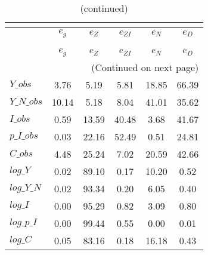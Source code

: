  
\begin{center}
\begin{longtable}{lccccc} 
\caption{VARIANCE DECOMPOSITION (in percent)}\\
 \label{Table:th_var_decomp_uncond}\\
\toprule 
$           $	 & 	 $       {e_g}$	 & 	 $       {e_Z}$	 & 	 $    {e_{ZI}}$	 & 	 $       {e_N}$	 & 	 $       {e_D}$\\
\midrule \endfirsthead 
\caption{(continued)}\\
 \toprule \\ 
$           $	 & 	 $       {e_g}$	 & 	 $       {e_Z}$	 & 	 $    {e_{ZI}}$	 & 	 $       {e_N}$	 & 	 $       {e_D}$\\
\midrule \endhead 
\midrule \multicolumn{6}{r}{(Continued on next page)} \\ \bottomrule \endfoot 
\bottomrule \endlastfoot 
$Y\_obs     $	 & 	        3.76	 & 	        5.19	 & 	        5.81	 & 	       18.85	 & 	       66.39 \\ 
$Y\_N\_obs  $	 & 	       10.14	 & 	        5.18	 & 	        8.04	 & 	       41.01	 & 	       35.62 \\ 
$I\_obs     $	 & 	        0.59	 & 	       13.59	 & 	       40.48	 & 	        3.68	 & 	       41.67 \\ 
$p\_I\_obs  $	 & 	        0.03	 & 	       22.16	 & 	       52.49	 & 	        0.51	 & 	       24.81 \\ 
$C\_obs     $	 & 	        4.48	 & 	       25.24	 & 	        7.02	 & 	       20.59	 & 	       42.66 \\ 
$log\_Y     $	 & 	        0.02	 & 	       89.10	 & 	        0.17	 & 	       10.20	 & 	        0.52 \\ 
$log\_Y\_N  $	 & 	        0.02	 & 	       93.34	 & 	        0.20	 & 	        6.05	 & 	        0.40 \\ 
$log\_I     $	 & 	        0.00	 & 	       95.29	 & 	        0.82	 & 	        3.09	 & 	        0.80 \\ 
$log\_p\_I  $	 & 	        0.00	 & 	       99.44	 & 	        0.55	 & 	        0.00	 & 	        0.01 \\ 
$log\_C     $	 & 	        0.05	 & 	       83.16	 & 	        0.18	 & 	       16.18	 & 	        0.43 \\ 
\end{longtable}
 \end{center}
